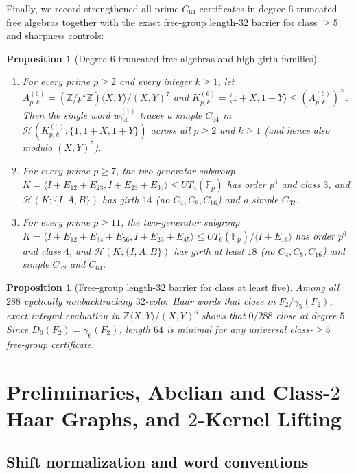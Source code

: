 \documentclass[11pt]{amsart}
\newtheorem{proposition}[theorem]{Proposition}
\theoremstyle{definition}
\theoremstyle{remark}
\newcommand{\F}{\mathbb{F}}
\newcommand{\Z}{\mathbb{Z}}
\newcommand{\Haar}{\mathcal{H}}
\begin{document}
Finally, we record strengthened all-prime $C_{64}$ certificates in degree-$6$ truncated free algebras together with the exact free-group length-$32$ barrier for class $\ge 5$ and sharpness controls:

\begin{proposition}[Degree-$6$ truncated free algebras and high-girth families]\label{prop:boundaries}
\leavevmode
\begin{enumerate}[label=(\alph*)]
\item For every prime $p \ge 2$ and every integer $k \ge 1$, let $A_{p,k}^{(6)} = (\Z/p^k\Z)\langle X,Y\rangle/(X,Y)^7$ and $K_{p,k}^{(6)} = \langle 1+X, 1+Y \rangle \le (A_{p,k}^{(6)})^\times$. Then the single word $w_{64}^{(1)}$ traces a simple $C_{64}$ in $\Haar(K_{p,k}^{(6)}; \{1, 1+X, 1+Y\})$ across all $p \ge 2$ and $k \ge 1$ (and hence also modulo $(X,Y)^5$).
\item For every prime $p \ge 7$, the two-generator subgroup $K = \langle I+E_{12}+E_{23}, I+E_{23}+E_{34}\rangle \le UT_4(\F_p)$ has order $p^4$ and class $3$, and $\Haar(K; \{I, A, B\})$ has girth $14$ (no $C_4, C_8, C_{16}$) and a simple $C_{32}$.
\item For every prime $p \ge 11$, the two-generator subgroup $K = \langle I+E_{12}+E_{34}+E_{56}, I+E_{23}+E_{45}\rangle \le UT_6(\F_p)/\langle I+E_{16}\rangle$ has order $p^6$ and class $4$, and $\Haar(K; \{I, A, B\})$ has girth at least $18$ (no $C_4, C_8, C_{16}$) and simple $C_{32}$ and $C_{64}$.
\end{enumerate}
\end{proposition}

\begin{proposition}[Free-group length-$32$ barrier for class at least five]\label{prop:barrier32}
Among all $288$ cyclically nonbacktracking $32$-color Haar words that close in $F_2/\gamma_5(F_2)$, exact integral evaluation in $\Z\langle X,Y\rangle/(X,Y)^6$ shows that $0/288$ close at degree $5$. Since $D_6(F_2) = \gamma_6(F_2)$, length $64$ is minimal for any universal class-$\ge 5$ free-group certificate.
\end{proposition}

\section{Preliminaries, Abelian and Class-$2$ Haar Graphs, and $2$-Kernel Lifting}\label{sec:prelim}

\subsection{Shift normalization and word conventions}
\end{document}
